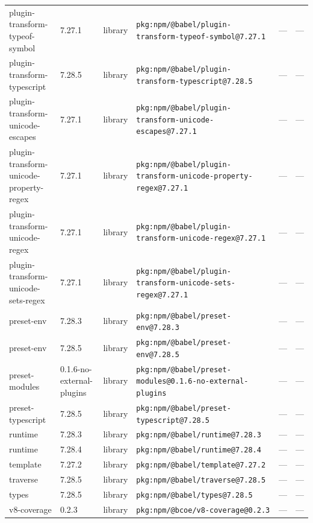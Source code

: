 \documentclass[11pt,a4paper]{article}
\begin{document}
\begin{longtable}{|p{4cm}|p{2cm}|p{1.6cm}|p{5cm}|p{1.5cm}|p{3.5cm}|}
\raggedright plugin-transform-typeof-symbol & 7.27.1 & library & \small\texttt{pkg:npm/@babel/plugin-transform-typeof-symbol@7.27.1} & — & \small — \\
\raggedright plugin-transform-typescript & 7.28.5 & library & \small\texttt{pkg:npm/@babel/plugin-transform-typescript@7.28.5} & — & \small — \\
\raggedright plugin-transform-unicode-escapes & 7.27.1 & library & \small\texttt{pkg:npm/@babel/plugin-transform-unicode-escapes@7.27.1} & — & \small — \\
\raggedright plugin-transform-unicode-property-regex & 7.27.1 & library & \small\texttt{pkg:npm/@babel/plugin-transform-unicode-property-regex@7.27.1} & — & \small — \\
\raggedright plugin-transform-unicode-regex & 7.27.1 & library & \small\texttt{pkg:npm/@babel/plugin-transform-unicode-regex@7.27.1} & — & \small — \\
\raggedright plugin-transform-unicode-sets-regex & 7.27.1 & library & \small\texttt{pkg:npm/@babel/plugin-transform-unicode-sets-regex@7.27.1} & — & \small — \\
\raggedright preset-env & 7.28.3 & library & \small\texttt{pkg:npm/@babel/preset-env@7.28.3} & — & \small — \\
\raggedright preset-env & 7.28.5 & library & \small\texttt{pkg:npm/@babel/preset-env@7.28.5} & — & \small — \\
\raggedright preset-modules & 0.1.6-no-external-plugins & library & \small\texttt{pkg:npm/@babel/preset-modules@0.1.6-no-external-plugins} & — & \small — \\
\raggedright preset-typescript & 7.28.5 & library & \small\texttt{pkg:npm/@babel/preset-typescript@7.28.5} & — & \small — \\
\raggedright runtime & 7.28.3 & library & \small\texttt{pkg:npm/@babel/runtime@7.28.3} & — & \small — \\
\raggedright runtime & 7.28.4 & library & \small\texttt{pkg:npm/@babel/runtime@7.28.4} & — & \small — \\
\raggedright template & 7.27.2 & library & \small\texttt{pkg:npm/@babel/template@7.27.2} & — & \small — \\
\raggedright traverse & 7.28.5 & library & \small\texttt{pkg:npm/@babel/traverse@7.28.5} & — & \small — \\
\raggedright types & 7.28.5 & library & \small\texttt{pkg:npm/@babel/types@7.28.5} & — & \small — \\
\raggedright v8-coverage & 0.2.3 & library & \small\texttt{pkg:npm/@bcoe/v8-coverage@0.2.3} & — & \small — \\

\end{longtable}
\end{document}
